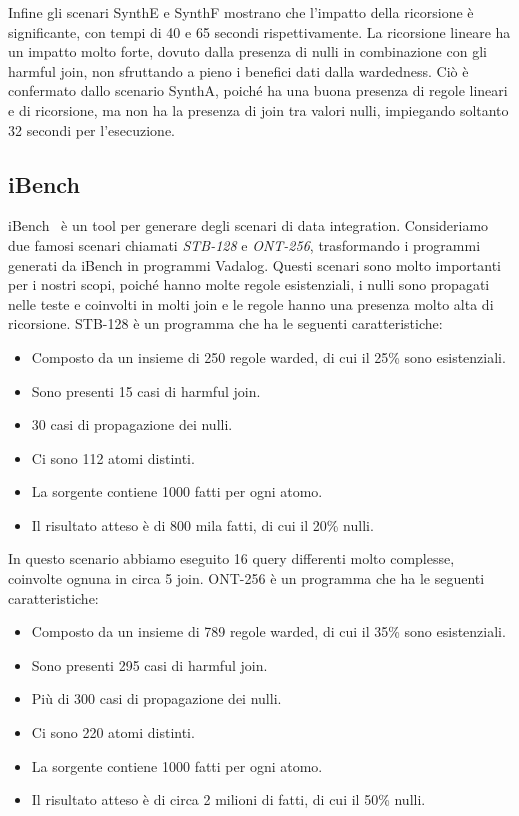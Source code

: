 Infine gli scenari SynthE e SynthF mostrano che l'impatto della ricorsione è significante, con tempi di 40 e 65 secondi rispettivamente. La ricorsione lineare ha un impatto molto forte, dovuto dalla presenza di nulli in combinazione con gli harmful join, non sfruttando a pieno i benefici dati dalla wardedness. Ciò è confermato dallo scenario SynthA, poiché ha una buona presenza di regole lineari e di ricorsione, ma non ha la presenza di join tra valori nulli, impiegando soltanto 32 secondi per l'esecuzione.

\subsection{iBench}

iBench~\cite{arocena2015ibench} è un tool per generare degli scenari di data integration. Consideriamo due famosi scenari chiamati \emph{STB-128} e \emph{ONT-256}, trasformando i programmi generati da iBench in programmi Vadalog. \newline
Questi scenari sono molto importanti per i nostri scopi, poiché hanno molte regole esistenziali, i nulli sono propagati nelle teste e coinvolti in molti join e le regole hanno una presenza molto alta di ricorsione. \newline
STB-128 è un programma che ha le seguenti caratteristiche: 
\begin{itemize}
	\item Composto da un insieme di 250 regole warded, di cui il 25\% sono esistenziali.
	\item Sono presenti 15 casi di harmful join.
	\item 30 casi di propagazione dei nulli.
	\item Ci sono 112 atomi distinti.
	\item La sorgente contiene 1000 fatti per ogni atomo.
	\item Il risultato atteso è di 800 mila fatti, di cui il 20\% nulli.
\end{itemize}
In questo scenario abbiamo eseguito 16 query differenti molto complesse, coinvolte ognuna in circa 5 join.\newline
ONT-256 è un programma che ha le seguenti caratteristiche:
\begin{itemize}
	\item Composto da un insieme di 789 regole warded, di cui il 35\% sono esistenziali. 
	\item Sono presenti 295 casi di harmful join.
	\item Più di 300 casi di propagazione dei nulli.
	\item Ci sono 220 atomi distinti.
	\item La sorgente contiene 1000 fatti per ogni atomo.
	\item Il risultato atteso è di circa 2 milioni di fatti, di cui il 50\% nulli.
\end{itemize}
